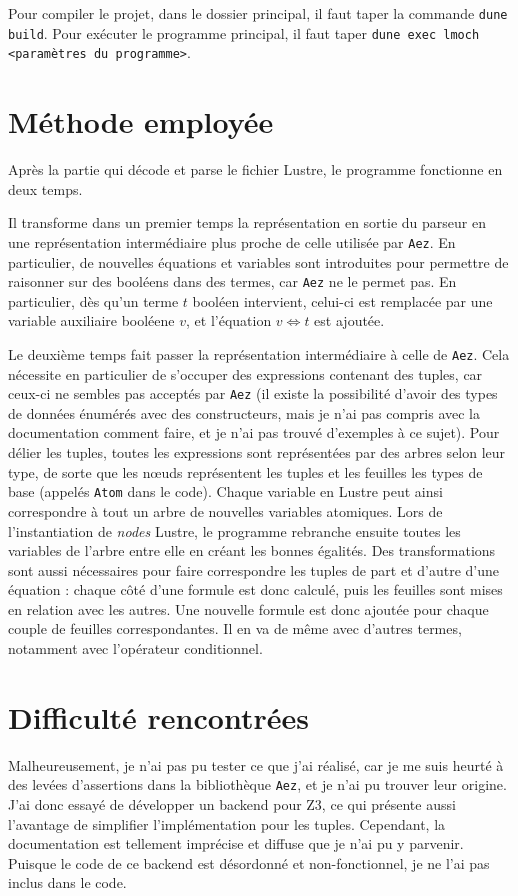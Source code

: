 \documentclass{article}
\begin{document}
Pour compiler le projet, dans le dossier principal, il faut taper la commande \texttt{dune build}. Pour exécuter le programme principal, il faut taper \texttt{dune exec lmoch <paramètres du programme>}.

\section{Méthode employée}

Après la partie qui décode et parse le fichier Lustre, le programme fonctionne en deux temps.

Il transforme dans un premier temps la représentation en sortie du parseur en une représentation intermédiaire plus proche de celle utilisée par \texttt{Aez}. En particulier, de nouvelles équations et variables sont introduites pour permettre de raisonner sur des booléens dans des termes, car \texttt{Aez} ne le permet pas. En particulier, dès qu'un terme \(t\) booléen intervient, celui-ci est remplacée par une variable auxiliaire booléene \(v\), et l'équation \(v \Longleftrightarrow t\) est ajoutée.

Le deuxième temps fait passer la représentation intermédiaire à celle de \texttt{Aez}. Cela nécessite en particulier de s'occuper des expressions contenant des tuples, car ceux-ci ne sembles pas acceptés par \texttt{Aez} (il existe la possibilité d'avoir des types de données énumérés avec des constructeurs, mais je n'ai pas compris avec la documentation comment faire, et je n'ai pas trouvé d'exemples à ce sujet). Pour délier les tuples, toutes les expressions sont représentées par des arbres selon leur type, de sorte que les nœuds représentent les tuples et les feuilles les types de base (appelés \texttt{Atom} dans le code).
Chaque variable en Lustre peut ainsi correspondre à tout un arbre de nouvelles variables atomiques. Lors de l'instantiation de \textit{nodes} Lustre, le programme rebranche ensuite toutes les variables de l'arbre entre elle en créant les bonnes égalités. Des transformations sont aussi nécessaires pour faire correspondre les tuples de part et d'autre d'une équation : chaque côté d'une formule est donc calculé, puis les feuilles sont mises en relation avec les autres. Une nouvelle formule est donc ajoutée pour chaque couple de feuilles correspondantes. Il en va de même avec d'autres termes, notamment avec l'opérateur conditionnel.

\section{Difficulté rencontrées}

Malheureusement, je n'ai pas pu tester ce que j'ai réalisé, car je me suis heurté à des levées d'assertions dans la bibliothèque \texttt{Aez}, et je n'ai pu trouver leur origine.
J'ai donc essayé de développer un backend pour Z3, ce qui présente aussi l'avantage de simplifier l'implémentation pour les tuples. Cependant, la documentation est tellement imprécise et diffuse que je n'ai pu y parvenir. Puisque le code de ce backend est désordonné et non-fonctionnel, je ne l'ai pas inclus dans le code.
\end{document}
